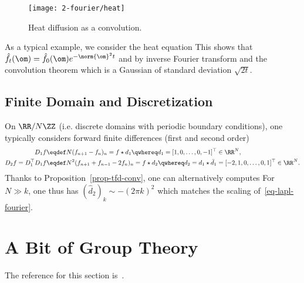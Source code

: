\begin{figure}
\centering
\texttt{[image: 2-fourier/heat]}
\caption{\label{fig-heat}
Heat diffusion as a convolution.
}
\end{figure}

As a typical example, we consider the heat equation
This shows that $\hat f_t(\om) = \hat f_0(\om) e^{-\norm{\om}^2 t}$ and by inverse Fourier transform and the convolution theorem
which is a Gaussian of standard deviation $\sqrt{2t}$.


\subsection{Finite Domain and Discretization}

On $\RR/N\ZZ$ (i.e. discrete domains with periodic boundary conditions), one typically considers forward finite differences (first and second order)
\begin{align}\label{eq-disc-diff-1}
	D_1 f &\eqdef N (f_{n+1}-f_n)_n = f \star d_1 \qwhereq d_1 = [1,0,\ldots,0,-1]^\top \in \RR^N, \\
	\label{eq-disc-diff-2}
	D_2 f = D_1^\top D_1 f & \eqdef N^2 (f_{n+1}+f_{n-1}-2f_n)_n = f \star d_2 \qwhereq d_2 = d_1 \star \bar d_1 = [-2,1,0,\ldots,0,1]^\top \in \RR^N.
\end{align}
Thanks to Proposition~\ref{prop-tfd-conv}, one can alternatively computes
For $N \gg k$, one thus has $(\hat d_2)_k \sim -(2\pi k)^2$ which matches the scaling of~\eqref{eq-lapl-fourier}. 


\section{A Bit of Group Theory}

The reference for this section is~\cite{peyre2004algebre}.

